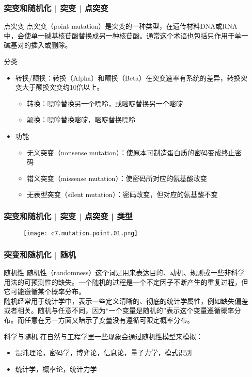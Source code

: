 \begin{frame}
  \frametitle{突变和随机化 | 突变 | 点突变}
  \begin{block}{点突变}
 点突变（point mutation）是突变的一种类型，在遗传材料DNA或RNA中，会使单一碱基核苷酸替换成另一种核苷酸。通常这个术语也包括只作用于单一碱基对的插入或删除。 
  \end{block}
  \pause
  \begin{block}{分类}
    \begin{itemize}
      \item 转换/颠换：转换（Alpha）和颠换（Beta）在突变速率有系统的差异，转换突变大于颠换突变约10倍以上。
	\begin{itemize}
	  \item 转换：嘌呤替换另一个嘌呤，或嘧啶替换另一个嘧啶
	  \item 颠换：嘌呤替换嘧啶，嘧啶替换嘌呤
	\end{itemize}
      \item 功能
	\begin{itemize}
	  \item 无义突变（nonsense mutation）：使原本可制造蛋白质的密码变成终止密码
	  \item 错义突变（missense mutation）：使密码所对应的氨基酸改变
	  \item 无表型突变（silent mutation）：密码改变，但对应的氨基酸不变
	\end{itemize}
    \end{itemize}
  \end{block}
\end{frame}

\begin{frame}
  \frametitle{突变和随机化 | 突变 | 点突变 | 类型}
  \begin{figure}
    \centering
    \texttt{[image: c7.mutation.point.01.png]}
  \end{figure}
\end{frame}

\begin{frame}
  \frametitle{突变和随机化 | 随机}
  \begin{block}{随机性}
    随机性（randomness）这个词是用来表达目的、动机、规则或一些非科学用法的可预测性的缺失。一个随机的过程是一个不定因子不断产生的重复过程，但它可能遵循某个概率分布。\\
    \vspace{1em}
    随机经常用于统计学中，表示一些定义清晰的、彻底的统计学属性，例如缺失偏差或者相关。随机与任意不同，因为“一个变量是随机的”表示这个变量遵循概率分布。而任意在另一方面又暗示了变量没有遵循可限定概率分布。
  \end{block}
  \pause
  \begin{block}{科学与随机}
    在自然与工程学里一些现象会通过随机性模型来模拟：
    \begin{itemize}
      \item 混沌理论，密码学，博弈论，信息论，量子力学，模式识别
      \item 统计学，概率论，统计力学
    \end{itemize}
  \end{block}
\end{frame}

